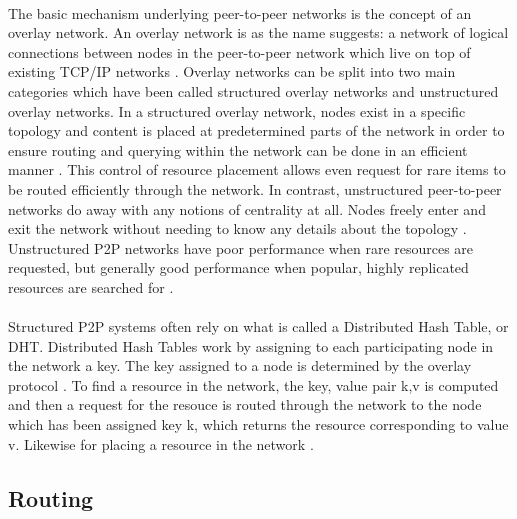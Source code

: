\documentclass[12pt,letterpaper]{article}
\begin{document}
\paragraph{}

The basic mechanism underlying peer-to-peer networks is the concept of an overlay network. 
An overlay network is as the name suggests: a network of logical connections between nodes in the peer-to-peer network which live on top of existing TCP/IP networks \cite{overlay}. 
Overlay networks can be split into two main categories which have been called structured overlay networks and unstructured overlay networks. 
In a structured overlay network, nodes exist in a specific topology and content is placed at predetermined parts of the network in order to ensure routing and querying within the network can be done in an efficient manner \cite{overlay}. 
This control of resource placement allows even request for rare items to be routed efficiently through the network.
In contrast, unstructured peer-to-peer networks do away with any notions of centrality at all. 
Nodes freely enter and exit the network without needing to know any details about the topology \cite{overlay}.
Unstructured P2P networks have poor performance when rare resources are requested, but generally good performance when popular, highly replicated resources are searched for \cite{overlay}.

\paragraph{}

Structured P2P systems often rely on what is called a Distributed Hash Table, or DHT. Distributed Hash Tables work by assigning to each participating node in the network a key. 
The key assigned to a node is determined by the overlay protocol \cite{overlay}. To find a resource in the network, the key, value pair {k,v} is computed and then a request for the resouce is routed through the network to the node which has been assigned key k, which returns the resource corresponding to value v.
Likewise for placing a resource in the network \cite{overlay}.

\subsection{Routing}

\paragraph{}
\end{document}
